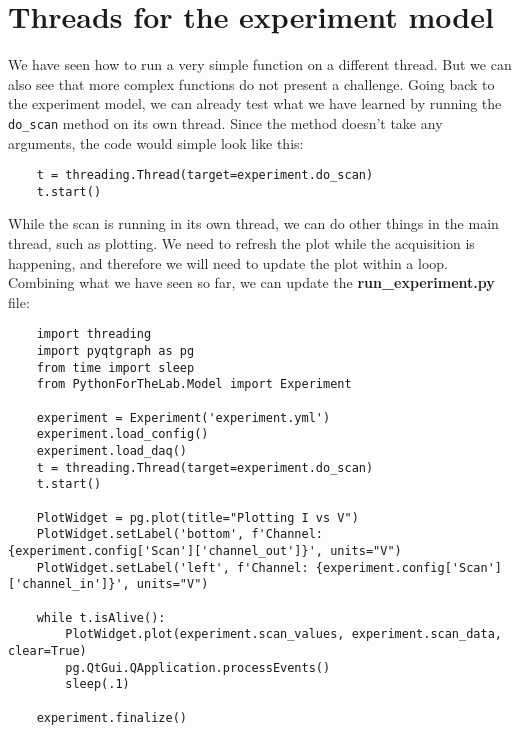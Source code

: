 
\section{Threads for the experiment model}\label{section:threads-experiment-model}
We have seen how to run a very simple function on a different thread. But we can also see that more complex functions do not present a challenge. Going back to the experiment model, we can already test what we have learned by running the \texttt{do\_scan} method on its own thread. Since the method doesn't take any arguments, the code would simple look like this:

\begin{verbatim}
    t = threading.Thread(target=experiment.do_scan)
    t.start()
\end{verbatim}

While the scan is running in its own thread, we can do other things in the main thread, such as plotting. We need to refresh the plot while the acquisition is happening, and therefore we will need to update the plot within a loop. Combining what we have seen so far, we can update the \textbf{run\_experiment.py} file:

\begin{verbatim}
    import threading
    import pyqtgraph as pg
    from time import sleep
    from PythonForTheLab.Model import Experiment

    experiment = Experiment('experiment.yml')
    experiment.load_config()
    experiment.load_daq()
    t = threading.Thread(target=experiment.do_scan)
    t.start()

    PlotWidget = pg.plot(title="Plotting I vs V")
    PlotWidget.setLabel('bottom', f'Channel: {experiment.config['Scan']['channel_out']}', units="V")
    PlotWidget.setLabel('left', f'Channel: {experiment.config['Scan']['channel_in']}', units="V")

    while t.isAlive():
        PlotWidget.plot(experiment.scan_values, experiment.scan_data, clear=True)
        pg.QtGui.QApplication.processEvents()
        sleep(.1)

    experiment.finalize()
\end{verbatim}

